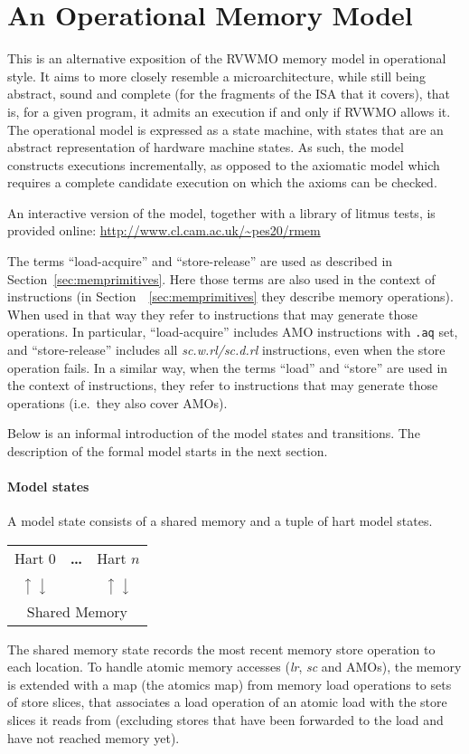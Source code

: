 \section{An Operational Memory Model}
This is an alternative exposition of the RVWMO memory model in operational style.
It aims to more closely resemble a microarchitecture, while still being abstract, sound and complete (for the fragments of the ISA that it covers), that is, for a given program, it admits an execution if and only if RVWMO allows it.
The operational model is expressed as a state machine, with states that are an abstract representation of hardware machine states.
As such, the model constructs executions incrementally, as opposed to the axiomatic model which requires a complete candidate execution on which the axioms can be checked.

An interactive version of the model, together with a library of litmus tests,
is provided online: \url{http://www.cl.cam.ac.uk/~pes20/rmem}

The terms ``load-acquire'' and ``store-release'' are used as described in Section~\ref{sec:memprimitives}.
Here those terms are also used in the context of instructions (in Section~~\ref{sec:memprimitives} they describe memory operations).
When used in that way they refer to instructions that may generate those operations.
In particular, ``load-acquire'' includes AMO instructions with {\tt .aq} set, and ``store-release'' includes all {\em sc.w.rl/sc.d.rl} instructions, even when the store operation fails.
In a similar way, when the terms ``load'' and ``store'' are used in the context of instructions, they refer to instructions that may generate those operations (i.e.~they also cover AMOs).

Below is an informal introduction of the model states and transitions.
The description of the formal model starts in the next section.

\paragraph{Model states}
A model state consists of a shared memory and a tuple of hart model states.
\begin{center}
\sffamily
\begin{tabular}{ccc}
\cline{1-1}\cline{3-3}
\multicolumn{1}{|c|}{Hart 0} & \bf \dots & \multicolumn{1}{|c|}{Hart $n$} \\
\cline{1-1}\cline{3-3}
$\big\uparrow$ $\big\downarrow$ & & $\big\uparrow$ $\big\downarrow$ \\
\hline
\multicolumn{3}{|c|}{Shared Memory} \\
\hline
\end{tabular}
\end{center}
The shared memory state records the most recent memory store operation to each location.
To handle atomic memory accesses ({\em  lr}, {\em sc} and AMOs), the memory is extended with a map (the atomics map) from memory load operations to sets of store slices, that associates a load operation of an atomic load with the store slices it reads from (excluding stores that have been forwarded to the load and have not reached memory yet).

